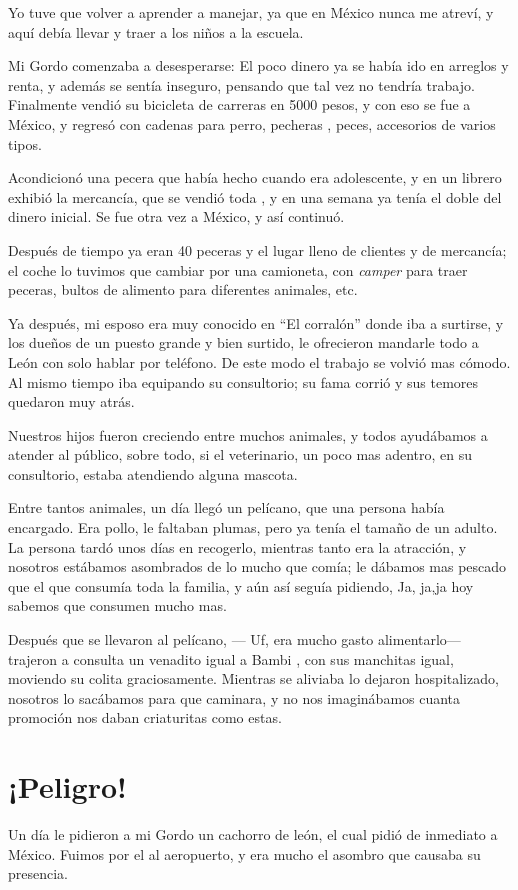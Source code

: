 \documentclass[letterpaper, 12pt]{book}
\begin{document}
Yo tuve que volver a aprender a manejar, ya que en México nunca me atreví, y aquí debía llevar y traer a los niños a la escuela.

Mi Gordo comenzaba a desesperarse: El poco dinero ya se había ido en arreglos y renta, y además se sentía inseguro, pensando que tal vez no tendría trabajo. Finalmente vendió su bicicleta de carreras en 5000 pesos, y con eso se fue a México, y regresó con cadenas para perro, pecheras , peces, accesorios de varios tipos.

Acondicionó una pecera que había hecho cuando era adolescente, y en un librero exhibió la mercancía, que se vendió toda , y en una semana ya tenía el doble del dinero inicial. Se fue otra vez a México, y así continuó. 

Después de tiempo ya eran 40 peceras y el lugar lleno de clientes y de mercancía; el coche lo tuvimos que cambiar por una camioneta, con {\it camper} para traer peceras, bultos de alimento para diferentes animales, etc. 

Ya después, mi esposo era muy conocido en ``El corralón'' donde iba a surtirse, y los dueños de un puesto grande y bien surtido, le ofrecieron mandarle todo a León con solo hablar por teléfono. De este modo el trabajo se volvió mas cómodo. Al mismo tiempo iba equipando su consultorio; su fama corrió y sus temores quedaron muy atrás.

Nuestros hijos fueron creciendo entre muchos animales, y todos ayudábamos a atender al público, sobre todo, si el veterinario, un poco mas adentro, en su consultorio, estaba atendiendo alguna mascota.

Entre tantos animales, un día llegó un pelícano, que una persona había encargado. Era pollo, le faltaban plumas, pero ya tenía el tamaño de un adulto.
 La persona tardó unos días en recogerlo, mientras tanto era la atracción, y nosotros estábamos asombrados de lo mucho que comía; le dábamos mas pescado que el que consumía toda la familia, y aún así seguía pidiendo, Ja, ja,ja hoy sabemos que consumen mucho mas.
 
 Después que se llevaron al pelícano, --- Uf, era mucho gasto alimentarlo--- trajeron a consulta un venadito igual a Bambi , con sus manchitas igual, moviendo su colita graciosamente. Mientras se aliviaba lo dejaron hospitalizado, nosotros lo sacábamos para que caminara, y no nos imaginábamos cuanta promoción nos daban criaturitas como estas.
\chapter{¡Peligro!}
Un día le pidieron a mi Gordo un cachorro de león, el cual pidió de inmediato a México. Fuimos por el al aeropuerto, y era mucho el asombro que causaba su presencia.
\end{document}
